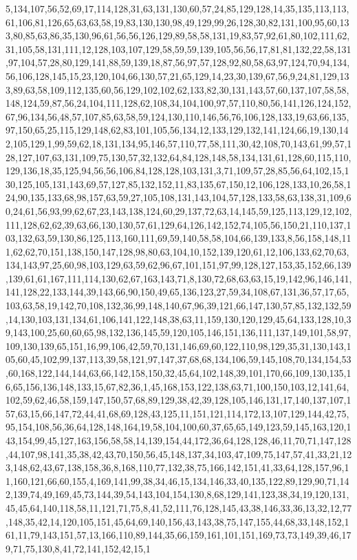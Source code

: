\documentclass[11pt]{article}
\begin{document}
\begin{vncode}
5,134,107,56,52,69,17,114,128,31,63,131,130,60,57,24,85,129,128,14,35,135,113,113,61,106,81,126,65,63,63,58,19,83,130,130,98,49,129,99,26,128,30,82,131,100,95,60,133,80,85,63,86,35,130,96,61,56,56,126,129,89,58,58,131,19,83,57,92,61,80,102,111,62,31,105,58,131,111,12,128,103,107,129,58,59,59,139,105,56,56,17,81,81,132,22,58,131,97,104,57,28,80,129,141,88,59,139,18,87,56,97,57,128,92,80,58,63,97,124,70,94,134,56,106,128,145,15,23,120,104,66,130,57,21,65,129,14,23,30,139,67,56,9,24,81,129,133,89,63,58,109,112,135,60,56,129,102,102,62,133,82,30,131,143,57,60,137,107,58,58,148,124,59,87,56,24,104,111,128,62,108,34,104,100,97,57,110,80,56,141,126,124,152,67,96,134,56,48,57,107,85,63,58,59,124,130,110,146,56,76,106,128,133,19,63,66,135,97,150,65,25,115,129,148,62,83,101,105,56,134,12,133,129,132,141,124,66,19,130,142,105,129,1,99,59,62,18,131,134,95,146,57,110,77,58,111,30,42,108,70,143,61,99,57,128,127,107,63,131,109,75,130,57,32,132,64,84,128,148,58,134,131,61,128,60,115,110,129,136,18,35,125,94,56,56,106,84,128,128,103,131,3,71,109,57,28,85,56,64,102,15,130,125,105,131,143,69,57,127,85,132,152,11,83,135,67,150,12,106,128,133,10,26,58,124,90,135,133,68,98,157,63,59,27,105,108,131,143,104,57,128,133,58,63,138,31,109,60,24,61,56,93,99,62,67,23,143,138,124,60,29,137,72,63,14,145,59,125,113,129,12,102,111,128,62,62,39,63,66,130,130,57,61,129,64,126,142,152,74,105,56,150,21,110,137,103,132,63,59,130,86,125,113,160,111,69,59,140,58,58,104,66,139,133,8,56,158,148,111,62,62,70,151,138,150,147,128,98,80,63,104,10,152,139,120,61,12,106,133,62,70,63,134,143,97,25,60,98,103,129,63,59,62,96,67,101,151,97,99,128,127,153,35,152,66,139,139,61,61,167,111,114,130,62,67,163,143,71,8,130,72,68,63,63,15,19,142,96,146,141,141,128,22,133,144,39,143,66,90,150,49,65,136,123,27,59,34,108,67,131,36,57,17,65,103,63,58,19,142,70,108,132,36,99,148,140,67,96,39,121,66,147,130,57,85,132,132,59,14,130,103,131,134,61,106,141,122,148,38,63,11,159,130,120,129,45,64,133,128,10,39,143,100,25,60,60,65,98,132,136,145,59,120,105,146,151,136,111,137,149,101,58,97,109,130,139,65,151,16,99,106,42,59,70,131,146,69,60,122,110,98,129,35,31,130,143,105,60,45,102,99,137,113,39,58,121,97,147,37,68,68,134,106,59,145,108,70,134,154,53,60,168,122,144,144,63,66,142,158,150,32,45,64,102,148,39,101,170,66,109,130,135,16,65,156,136,148,133,15,67,82,36,1,45,168,153,122,138,63,71,100,150,103,12,141,64,102,59,62,46,58,159,147,150,57,68,89,129,38,42,39,128,105,146,131,17,140,137,107,157,63,15,66,147,72,44,41,68,69,128,43,125,11,151,121,114,172,13,107,129,144,42,75,95,154,108,56,36,64,128,148,164,19,58,104,100,60,37,65,65,149,123,59,145,163,120,143,154,99,45,127,163,156,58,58,14,139,154,44,172,36,64,128,128,46,11,70,71,147,128,44,107,98,141,35,38,42,43,70,150,56,45,148,137,34,103,47,109,75,147,57,41,33,21,123,148,62,43,67,138,158,36,8,168,110,77,132,38,75,166,142,151,41,33,64,128,157,96,11,160,121,66,60,155,4,169,141,99,38,34,46,15,134,146,33,40,135,122,89,129,90,71,142,139,74,49,169,45,73,144,39,54,143,104,154,130,8,68,129,141,123,38,34,19,120,131,45,45,64,140,118,58,11,121,71,75,8,41,52,111,76,128,145,43,38,146,33,36,13,32,12,77,148,35,42,14,120,105,151,45,64,69,140,156,43,143,38,75,147,155,44,68,33,148,152,161,11,79,143,151,57,13,166,110,89,144,35,66,159,161,101,151,169,73,73,149,39,46,179,71,75,130,8,41,72,141,152,42,15,1
\end{vncode}
\end{document}
